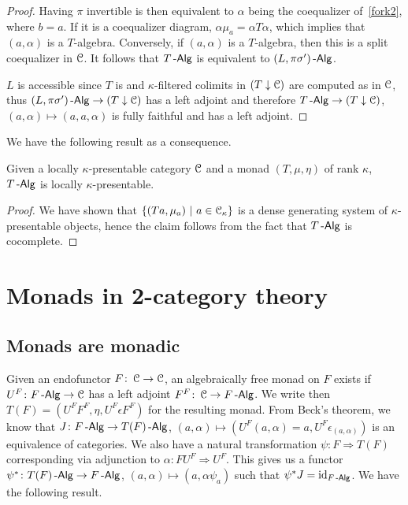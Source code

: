 \documentclass[a4paper,11pt,oneside,openany]{scrbook}
\begin{document}
\begin{proof}
    Having $\pi$ invertible is then equivalent to $\alpha$ being the coequalizer of~\ref{fork2}, where $b=a$. If it is a coequalizer diagram, $\alpha\mu_a=\alpha T\alpha$, which implies that $(a,\alpha)$ is a $T$-algebra. Conversely, if $(a,\alpha)$ is a $T$-algebra, then this is a split coequalizer in $\operatorname{\mathcal{C}}$. It follows that $T\operatorname{-\mathsf{Alg}}$ is equivalent to $(L,\pi\sigma')\operatorname{-\mathsf{Alg}}$.
    
    $L$ is accessible since $T$ is and $\kappa$-filtered colimits in $(T\downarrow\operatorname{\mathcal{C}})$ are computed as in $\operatorname{\mathcal{C}}$, thus $(L,\pi\sigma')\operatorname{-\mathsf{Alg}}\rightarrow(T\downarrow\operatorname{\mathcal{C}})$ has a left adjoint and therefore $T\operatorname{-\mathsf{Alg}}\rightarrow (T\downarrow\operatorname{\mathcal{C}})$, $(a,\alpha)\mapsto(a,a,\alpha)$ is fully faithful and has a left adjoint.
\end{proof}

We have the following result as a consequence.

\begin{thm}
    Given a locally $\kappa$-presentable category $\operatorname{\mathcal{C}}$ and a monad $(T,\mu,\eta)$ of rank $\kappa$, $T\operatorname{-\mathsf{Alg}}$ is locally $\kappa$-presentable.
\end{thm}

\begin{proof}
    We have shown that $\{(Ta,\mu_a)\ |\ a\in\operatorname{\mathcal{C}}_\kappa\}$ is a dense generating system of $\kappa$-presentable objects, hence the claim follows from the fact that $T\operatorname{-\mathsf{Alg}}$ is cocomplete.
\end{proof}

\chapter{Monads in 2-category theory}

\section{Monads are monadic}

Given an endofunctor $F\colon\operatorname{\mathcal{C}}\rightarrow\operatorname{\mathcal{C}}$, an algebraically free monad on $F$ exists if $U^F\colon F\operatorname{-\mathsf{Alg}}\rightarrow\operatorname{\mathcal{C}}$ has a left adjoint $F^F\colon\operatorname{\mathcal{C}}\rightarrow F\operatorname{-\mathsf{Alg}}$. We write then $T(F)=(U^FF^F,\eta,U^F\epsilon F^F)$ for the resulting monad. From Beck's theorem, we know that $J\colon F\operatorname{-\mathsf{Alg}}\rightarrow T(F)\operatorname{-\mathsf{Alg}}$, $(a,\alpha)\mapsto (U^F(a,\alpha)=a,U^F\epsilon_{(a,\alpha)})$ is an equivalence of categories. We also have a natural transformation $\psi\colon F\Rightarrow T(F)$ corresponding via adjunction to $\alpha\colon FU^F\Rightarrow U^F$. This gives us a functor $\psi^*\colon T(F)\operatorname{-\mathsf{Alg}}\rightarrow F\operatorname{-\mathsf{Alg}}$, $(a,\alpha)\mapsto (a,\alpha\psi_a)$ such that $\psi^* J=\operatorname{id}_{F\operatorname{-\mathsf{Alg}}}$. We have the following result.
\end{document}
